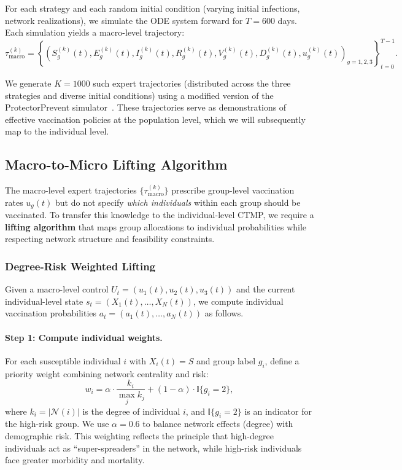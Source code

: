 For each strategy and each random initial condition (varying initial infections,
network realizations), we simulate the ODE system forward for $T=600$ days. Each
simulation yields a macro-level trajectory:
\begin{equation}
\tau_{\text{macro}}^{(k)} = \left\{
(S_g^{(k)}(t), E_g^{(k)}(t), I_g^{(k)}(t), R_g^{(k)}(t), V_g^{(k)}(t), D_g^{(k)}(t),
u_g^{(k)}(t))_{g=1,2,3}
\right\}_{t=0}^{T-1}.
\end{equation}

We generate $K=1000$ such expert trajectories (distributed across the three strategies
and diverse initial conditions) using a modified version of the ProtectorPrevent
simulator~\citep{protectorprevent}. These trajectories serve as demonstrations of
effective vaccination policies at the population level, which we will subsequently
map to the individual level.


\subsection{Macro-to-Micro Lifting Algorithm}
\label{sec:lifting}

The macro-level expert trajectories $\{\tau_{\text{macro}}^{(k)}\}$ prescribe
group-level vaccination rates $u_g(t)$ but do not specify \emph{which individuals}
within each group should be vaccinated. To transfer this knowledge to the individual-level
CTMP, we require a \textbf{lifting algorithm} that maps group allocations to
individual probabilities while respecting network structure and feasibility constraints.

\subsubsection{Degree-Risk Weighted Lifting}

Given a macro-level control $U_t = (u_1(t), u_2(t), u_3(t))$ and the current
individual-level state $s_t = (X_1(t), \ldots, X_N(t))$, we compute individual
vaccination probabilities $a_t = (a_1(t), \ldots, a_N(t))$ as follows.

\paragraph{Step 1: Compute individual weights.}
For each susceptible individual $i$ with $X_i(t) = S$ and group label $g_i$, define
a priority weight combining network centrality and risk:
\begin{equation}
w_i = \alpha \cdot \frac{k_i}{\max_j k_j} + (1-\alpha) \cdot \mathbb{I}\{g_i = 2\},
\label{eq:weight}
\end{equation}
where $k_i = |\mathcal{N}(i)|$ is the degree of individual $i$, and $\mathbb{I}\{g_i=2\}$
is an indicator for the high-risk group. We use $\alpha = 0.6$ to balance network
effects (degree) with demographic risk. This weighting reflects the principle that
high-degree individuals act as ``super-spreaders'' in the network, while high-risk
individuals face greater morbidity and mortality.

